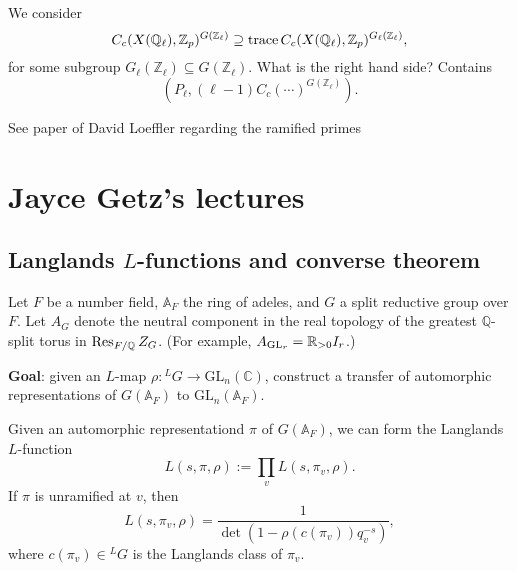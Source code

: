 \documentclass[reqno]{amsart} 
\begin{document}
\begin{remark}\label{remark:cq6tho73c6}
  We consider
  \begin{equation*}
    C_c(X(\mathbb{Q}_{\ell}), \mathbb{Z}_p)^{G(\mathbb{Z}_{\ell})}
    \supseteq \operatorname{trace} C_c(X(\mathbb{Q}_{\ell}), \mathbb{Z}_p)^{G_{\ell}(\mathbb{Z}_{\ell})},
  \end{equation*}
  for some subgroup $G_{\ell}(\mathbb{Z}_{\ell}) \subseteq G(\mathbb{Z}_{\ell})$.  What is the right hand side?  Contains
  \begin{equation*}
    \left( P_{\ell} ,(\ell - 1) C_c(\dotsb)^{G(\mathbb{Z}_{\ell})} \right).
  \end{equation*}
\end{remark}
\begin{remark}\label{remark:cq6tho71jb}
  See paper of David Loeffler regarding the ramified primes
\end{remark}


\section{Jayce Getz's lectures}\label{sec:cq6tho1wyu}
\subsection{Langlands $L$-functions and converse theorem}\label{sec:cq6tho1xqr}

Let $F$ be a number field, $\mathbb{A}_F$ the ring of adeles, and $G$ a split reductive group over $F$.  Let $A_G$ denote the neutral component in the real topology of the greatest $\mathbb{Q}$-split torus in $\operatorname{Res}_{F / \mathbb{Q}} Z_G$.  (For example, $A_{\operatorname{GL}_r} = \mathbb{R}_{> 0} I_r$.)


\textbf{Goal}: given an $L$-map $\rho : {}^L G \rightarrow \mathrm{GL}_n(\mathbb{C})$, construct a transfer of automorphic representations of $G(\mathbb{A}_F)$ to $\mathrm{GL}_n(\mathbb{A}_F)$.

Given an automorphic representationd $\pi$ of $G(\mathbb{A}_F)$, we can form the Langlands $L$-function
\begin{equation*}
  L(s, \pi, \rho) := \prod_v L(s, \pi_v, \rho).
\end{equation*}
If $\pi$ is unramified at $v$, then
\begin{equation*}
  L(s, \pi_v, \rho) = \frac{1}{\det(1 - \rho(c(\pi_v)) q_v^{- s})},
\end{equation*}
where $c(\pi_v) \in{}^L G$ is the Langlands class of $\pi_v$.
\end{document}
